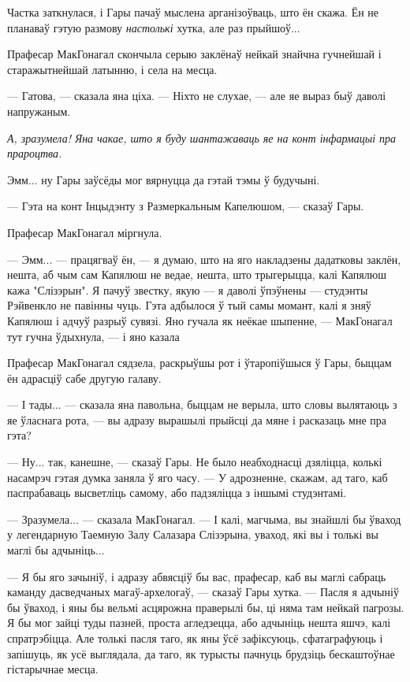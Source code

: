 Частка заткнулася, і Гары пачаў мыслена арганізоўваць, што ён скажа. Ён не планаваў
гэтую размову \emph{настолькі} хутка, але раз прыйшоў...

Прафесар МакГонагал скончыла серыю заклёнаў нейкай знайчна гучнейшай і старажытнейшай
латынню, і села на месца.

--- Гатова, --- сказала яна ціха. --- Ніхто не слухае, --- але яе 
выраз быў даволі напружаным.

\emph{А, зразумела! Яна чакае, што я буду шантажаваць яе на конт інфармацыі пра 
прароцтва.}

Эмм... ну Гары заўсёды мог вярнуцца да гэтай тэмы ў будучыні.

--- Гэта на конт Інцыдэнту з Размеркальным Капелюшом, --- сказаў Гары. 

Прафесар МакГонагал міргнула.

--- Эмм... --- працягваў ён, --- я думаю, што на яго накладзены дадатковы заклён,
нешта, аб чым сам Капялюш не ведае, нешта, што трыгерыцца, калі Капялюш кажа 
"Слізэрын". Я пачуў звестку, якую --- я даволі ўпэўнены ---
студэнты Рэйвенкло не павінны чуць. Гэта адбылося ў тый самы момант, калі 
я зняў Капялюш і адчуў разрыў сувязі. Яно гучала як неёкае шыпенне, --- МакГонагал тут 
гучна ўдыхнула, --- і яно казала 

Прафесар МакГонагал сядзела, раскрыўшы рот і ўтаропіўшыся ў Гары, быццам ён адрасціў 
сабе другую галаву.

--- І тады... --- сказала яна павольна, быццам не верыла, што словы вылятаюць з 
яе ўласнага рота, --- вы адразу вырашылі прыйсці да мяне і расказаць мне пра гэта?

--- Ну... так, канешне, --- сказаў Гары. Не было неабходнасці дзяліцца, колькі 
насамрэч гэтая думка заняла ў яго часу. --- У адрозненне, скажам, ад таго, каб 
паспрабаваць высветліць самому, або падзяліцца з іншымі студэнтамі.

--- Зразумела... --- сказала МакГонагал. --- І калі, магчыма, вы знайшлі бы ўваход 
у легендарную Таемную Залу Салазара Слізэрына, уваход, які вы і толькі вы маглі бы 
адчыніць...

--- Я бы яго зачыніў, і адразу абвясціў бы вас, прафесар, каб вы маглі сабраць 
каманду дасведчаных магаў-архелогаў, --- сказаў Гары хутка. --- Пасля я адчыніў бы
ўваход, і яны бы вельмі асцярожна праверылі бы, ці няма там нейкай пагрозы. Я бы мог
зайці туды пазней, проста агледзецца, або адчыніць нешта яшчэ, калі спратрэбіцца.
Але толькі пасля таго, як яны ўсё зафіксуюць, сфатаграфуюць і запішуць, як усё выглядала,
да таго, як турысты пачнуць брудзіць бескаштоўнае гістарычнае месца.

